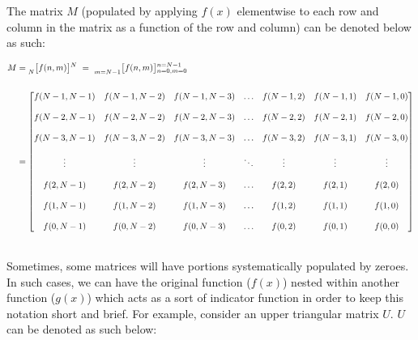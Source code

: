 \documentclass{article}
\begin{document}
The matrix $M$ (populated by applying $f(x)$ elementwise to each row and column in the matrix as a function of the row and column) can be denoted below as such:

\begin{align*}
    M&=   \prescript{}{N}{\begin{bmatrix} f(n, m) \end{bmatrix}}^{N} \ 
      = \ \prescript{}{m = N - 1}{\begin{bmatrix} f(n, m) \end{bmatrix}}^{n = N - 1}_{n = 0,m =0} \\ \\
     &= \begin{bmatrix}
            f(N - 1, N - 1) & f(N - 1, N - 2) & f(N - 1, N - 3) & \ldots & f(N - 1, 2) & f(N - 1, 1) & f(N - 1, 0) \\ \\
            f(N - 2, N - 1) & f(N - 2, N - 2) & f(N - 2, N - 3) & \ldots & f(N - 2, 2) & f(N - 2, 1) & f(N - 2, 0) \\ \\
            f(N - 3, N - 1) & f(N - 3, N - 2) & f(N - 3, N - 3) & \ldots & f(N - 3, 2) & f(N - 3, 1) & f(N - 3, 0) \\ \\
                     \vdots &          \vdots &          \vdots & \ddots &      \vdots &      \vdots &      \vdots \\ \\
            f(    2, N - 1) & f(    2, N - 2) & f(    2, N - 3) & \ldots & f(    2, 2) & f(    2, 1) & f(    2, 0) \\ \\
            f(    1, N - 1) & f(    1, N - 2) & f(    1, N - 3) & \ldots & f(    1, 2) & f(    1, 1) & f(    1, 0) \\ \\
            f(    0, N - 1) & f(    0, N - 2) & f(    0, N - 3) & \ldots & f(    0, 2) & f(    0, 1) & f(    0, 0)
          \end{bmatrix} \\ \\
  \end{align*} 

\newpage

Sometimes, some matrices will have portions systematically populated by zeroes. In such cases, we can have the original function ($f(x)$) nested within another function ($g(x)$) which acts as a sort of indicator function in order to keep this notation short and brief. For example, consider an upper triangular matrix $U$. $U$ can be denoted as such below:
\end{document}
